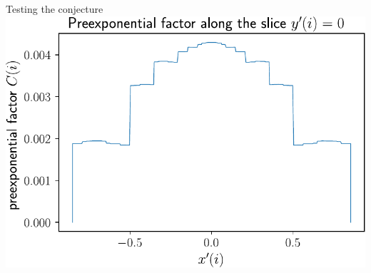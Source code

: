 \begin{frame}{Testing the conjecture}
\>
\<{5cm}
\centering
\includegraphics[width=1.\textwidth]{img/4_part3/15_SKK_cake_slice_7_perp}
\>
\)
\end{frame}

